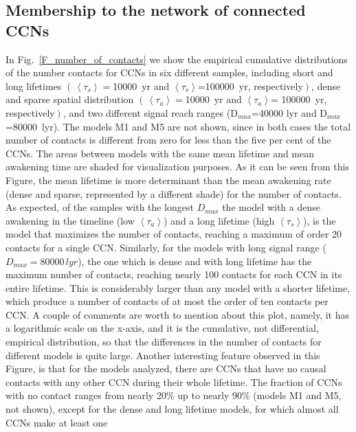 \documentclass[crop]{CSLB}
\newcommand{\ceti}{CCN}
\newcommand{\cetis}{CCNs}
\newcommand{\ffn}[1]{}
\begin{document}
\subsection{Membership to the network of connected \cetis{}}\label{SS_members}

\ffn{3}
%
In Fig.~\ref{F_number_of_contacts} we show the empirical cumulative
distributions of the number contacts for \cetis{} in six different
samples, including short and long lifetimes
$\left(\,\left<\tau_s\right>=\right.$10000~yr and
$\left<\tau_s\right>$=100000~yr, respectively$\left.\right)$, dense
and sparse spatial distribution
$\left(\,\left<\tau_a\right>=\right.$10000~yr and
$\left<\tau_a\right>$= 100000~yr, respectively$\left.\right)$, and two
different signal reach ranges (D$_{max}$=40000 lyr and
D$_{max}$=80000~lyr).
%
The models M1 and M5 are not shown, since in both cases the total
number of contacts is different from zero for less than the five per
cent of the \cetis{}.
%
The areas between models with the same mean lifetime and mean
awakening time are shaded for visualization purposes.
%
As it can be seen from this Figure, the mean lifetime is more
determinant than the mean awakening rate (dense and sparse,
represented by a different shade) for the number of contacts.
%
As expected, of the samples with the longest $D_{max}$ the model with
a dense awakening in the timeline (low $\left<\tau_a\right>$) and a
long lifetime (high $\left<\tau_s\right>$), is the model that
maximizes the number of contacts, reaching a maximum of order 20
contacts for a single \ceti{}.
%
Similarly, for the models with long signal range
($D_{max}=80000\,lyr$), the one which is dense and with long lifetime
has the maximum number of contacts, reaching nearly 100 contacts for
each \ceti{} in its entire lifetime.
%
This is considerably larger than any model with a shorter lifetime,
which produce a number of contacts of at most the order of ten
contacts per \ceti{}.
%
A couple of comments are worth to mention about this plot, namely, it
has a logarithmic scale on the x-axis, and it is the cumulative, not
differential, empirical distribution, so that the differences in the
number of contacts for different models is quite large.
%
Another interesting feature observed in this Figure, is that for the
models analyzed, there are \cetis{} that have no causal contacts with
any other \ceti{} during their whole lifetime.
%
The fraction of \cetis{} with no contact ranges from nearly 20\% up to
nearly 90\% (models M1 and M5, not shown), except for the dense and
long lifetime models, for which almost all \cetis{} make at least one
\end{document}
